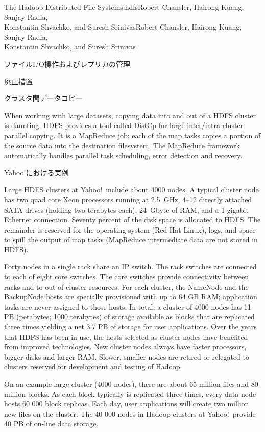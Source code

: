 \begin{aosachaptertoc}{The Hadoop Distributed File System}{s:hdfs}{Robert Chansler, Hairong Kuang, Sanjay Radia, \\ Konstantin Shvachko, and Suresh Srinivas}{Robert Chansler, Hairong Kuang, Sanjay Radia, \\ \hspace*{0.9cm} Konstantin Shvachko, and Suresh Srinivas}
\begin{aosasect1}{ファイルI/O操作およびレプリカの管理}
\begin{aosasect2}{廃止措置}
\end{aosasect2}

\begin{aosasect2}{クラスタ間データコピー}

When working with large datasets, copying data into and out of a HDFS
cluster is daunting.  HDFS provides a tool called DistCp for large
inter/intra-cluster parallel copying. It is a MapReduce job; each of
the map tasks copies a portion of the source data into the destination
filesystem. The MapReduce framework automatically handles parallel
task scheduling, error detection and recovery.

\end{aosasect2}

\end{aosasect1}

\begin{aosasect1}{Yahoo!における実例}

Large HDFS clusters at Yahoo!\ include about 4000 nodes. A typical
cluster node has two quad core Xeon processors running at 2.5~GHz,
4--12 directly attached SATA drives (holding two terabytes each), 24~Gbyte of
RAM, and a 1-gigabit Ethernet connection.  Seventy percent of the disk
space is allocated to HDFS\@. The remainder is reserved for the
operating system (Red Hat Linux), logs, and space to spill the output
of map tasks (MapReduce intermediate data are not stored in HDFS).

Forty nodes in a single rack share an IP switch. The rack switches are
connected to each of eight core switches. The core switches provide
connectivity between racks and to out-of-cluster resources. For each
cluster, the NameNode and the BackupNode hosts are specially
provisioned with up to 64 GB RAM; application tasks are never assigned
to those hosts. In total, a cluster of 4000 nodes has 11 PB
(petabytes; 1000 terabytes) of storage available as blocks that are
replicated three times yielding a net 3.7 PB of storage for user
applications. Over the years that HDFS has been in use, the hosts
selected as cluster nodes have benefited from improved
technologies. New cluster nodes always have faster processors, bigger
disks and larger RAM\@. Slower, smaller nodes are retired or relegated
to clusters reserved for development and testing of Hadoop.

On an example large cluster (4000 nodes), there are about 65 million
files and 80 million blocks. As each block typically is replicated
three times, every data node hosts 60 000 block replicas. Each day,
user applications will create two million new files on the
cluster. The 40 000 nodes in Hadoop clusters at Yahoo!\ provide 40 PB
of on-line data storage.


\end{aosasect1}
\end{aosachaptertoc}
